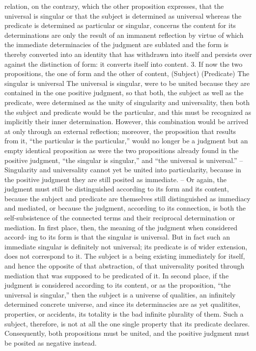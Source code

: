 relation, on the contrary, which the other proposition expresses, that the
universal is singular or that the subject is determined as universal whereas
the predicate is determined as particular or singular, concerns the content
for its determinations are only the result of an immanent reflection by
virtue of which the immediate determinacies of the judgment are sublated
and the form is thereby converted into an identity that has withdrawn into
itself and persists over against the distinction of form: it converts itself into
content.
3. If now the two propositions, the one of form and the other of content,
(Subject) (Predicate)
The singular is universal
The universal is singular,
were to be united because they are contained in the one positive judgment,
so that both, the subject as well as the predicate, were determined as the
unity of singularity and universality, then both the subject and predicate
would be the particular, and this must be recognized as implicitly their
inner determination. However, this combination would be arrived at only
through an external reflection; moreover, the proposition that results from
it, “the particular is the particular,” would no longer be a judgment but
an empty identical proposition as were the two propositions already found
in the positive judgment, “the singular is singular,” and “the universal
is universal.” – Singularity and universality cannot yet be united into
particularity, because in the positive judgment they are still posited as
immediate. – Or again, the judgment must still be distinguished according
to its form and its content, because the subject and predicate are themselves
still distinguished as immediacy and mediated, or because the judgment,
according to its connection, is both the self-subsistence of the connected
terms and their reciprocal determination or mediation.
In first place, then, the meaning of the judgment when considered accord-
ing to its form is that the singular is universal. But in fact such an immediate
singular is definitely not universal; its predicate is of wider extension, does
not correspond to it. The subject is a being existing immediately for itself, and
hence the opposite of that abstraction, of that universality posited through
mediation that was supposed to be predicated of it.
In second place, if the judgment is considered according to its content,
or as the proposition, “the universal is singular,” then the subject is a
universe of qualities, an infinitely determined concrete universe, and since
its determinacies are as yet qualitites, properties, or accidents, its totality
is the bad infinite plurality of them. Such a subject, therefore, is not at
all the one single property that its predicate declares. Consequently, both
propositions must be united, and the positive judgment must be posited as
negative instead.

